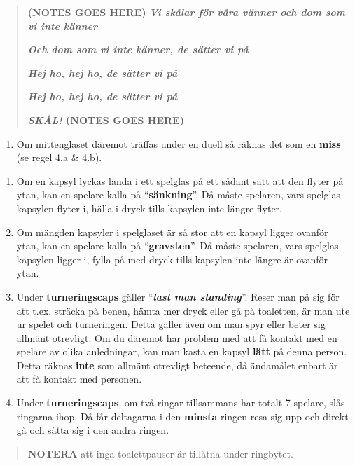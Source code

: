 \begin{quote}
\textbf{(NOTES GOES HERE)} \emph{\textbf{Vi skålar för våra vänner och dom som vi inte
känner}}

\emph{\textbf{Och dom som vi inte känner, de sätter vi på}}

\emph{\textbf{Hej ho, hej ho, de sätter vi på}}

\emph{\textbf{Hej ho, hej ho, de sätter vi på}}

\textbf{\emph{SKÅL!} (NOTES GOES HERE)}
\end{quote}

\begin{enumerate}
\def\labelenumi{\alph{enumi}.}
\item
  Om mittenglaset däremot träffas under en duell så räknas det som en
  \textbf{miss} (se regel 4.a \& 4.b).
\end{enumerate}

\begin{enumerate}
\def\labelenumi{\arabic{enumi}.}
\setcounter{enumi}{5}
\item
  Om en kapsyl lyckas landa i ett spelglas på ett sådant sätt att den
  flyter på ytan, kan en spelare kalla på ``\textbf{sänkning}''. Då
  måste spelaren, vars spelglas kapsylen flyter i, hälla i dryck tills
  kapsylen inte längre flyter.
\item
  Om mängden kapsyler i spelglaset är så stor att en kapsyl ligger
  ovanför ytan, kan en spelare kalla på ``\textbf{gravsten}''. Då måste
  spelaren, vars spelglas kapsylen ligger i, fylla på med dryck tills
  kapsylen inte längre är ovanför ytan.
\item
  Under \textbf{turneringscaps} gäller ``\emph{\textbf{last man
  standing}}''. Reser man på sig för att t.ex. sträcka på benen, hämta
  mer dryck eller gå på toaletten, är man ute ur spelet och turneringen.
  Detta gäller även om man spyr eller beter sig allmänt otrevligt. Om du
  däremot har problem med att få kontakt med en spelare av olika
  anledningar, kan man kasta en kapsyl \textbf{lätt} på denna person.
  Detta räknas \textbf{inte} som allmänt otrevligt beteende, då
  ändamålet enbart är att få kontakt med personen.
\item
  Under \textbf{turneringscaps}, om två ringar tillsammans har totalt 7
  spelare, slås ringarna ihop. Då får deltagarna i den \textbf{minsta}
  ringen resa sig upp och direkt gå och sätta sig i den andra ringen.
\end{enumerate}

\begin{quote}
\textbf{NOTERA} att inga toalettpauser är tillåtna under ringbytet.
\end{quote}

